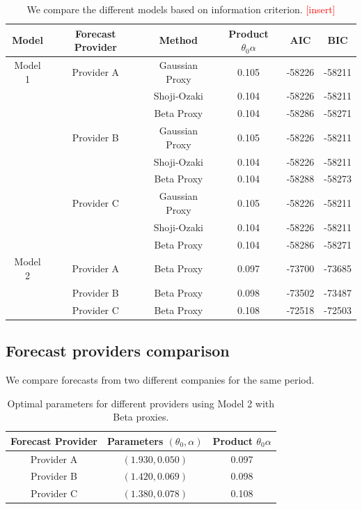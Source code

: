 \documentclass[11pt]{article}
\theoremstyle{definition}
\newcommand{\add}{\textcolor{red}{[insert]}}
\begin{document}
\begin{table}[H]
\centering
\begin{tabular}{cccccc}
\toprule
Model & Forecast Provider & Method & Product $\theta_0\alpha$   & AIC & BIC \\ \midrule
Model 1 & Provider A & Gaussian Proxy & 0.105 & -58226 & -58211 \\
 &  & Shoji-Ozaki & 0.104 & -58226 & -58211 \\
 &  & Beta Proxy & 0.104 & -58286 & -58271 \\
 & Provider B & Gaussian Proxy & 0.105 & -58226   & -58211 \\
 &  & Shoji-Ozaki & 0.104 & -58226 & -58211 \\
 &  & Beta Proxy & 0.104 & -58288 & -58273 \\
 & Provider C & Gaussian Proxy & 0.105 & -58226 & -58211 \\
 &  & Shoji-Ozaki & 0.104 & -58226 & -58211 \\
 &  & Beta Proxy & 0.104 & -58286 & -58271 \\
Model 2 & Provider A & Beta Proxy & 0.097 & -73700   & -73685 \\ 
 & Provider B & Beta Proxy & 0.098 &  -73502 & -73487 \\ 
 & Provider C & Beta Proxy & 0.108 & -72518 & -72503 \\ 
\bottomrule
\end{tabular}
\caption{We compare the different models based on information criterion. \add }
\label{tab:model_comparison}
\end{table}


\subsection{Forecast providers comparison} \label{Forecast_Comp}
We compare forecasts from two different companies for the same period.
\begin{table}[H]
\centering
\begin{tabular}{ccc}
\toprule
Forecast Provider & Parameters $(\theta_0, \alpha)$ & Product $\theta_0\alpha$ \\ \midrule
Provider A  & $(1.930,0.050)$  &  0.097 \\
Provider B  & $(1.420,0.069) $  &  0.098 \\ 
Provider C  & $(1.380,0.078) $  &  0.108 \\ 
\bottomrule
\end{tabular}
\caption{Optimal parameters for different providers using Model 2 with Beta proxies.}
\label{tab:forcast_comparison}
\end{table}
\end{document}
